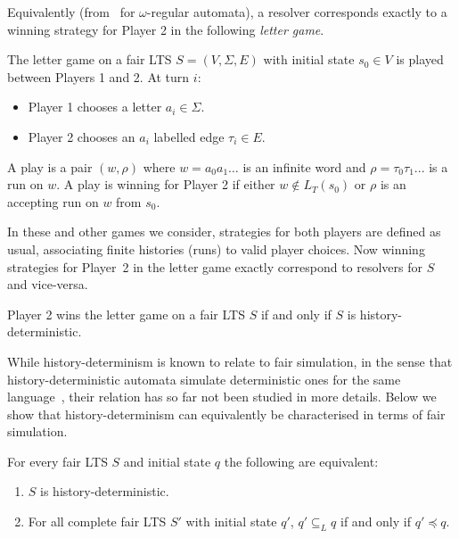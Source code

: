 \documentclass[10pt,a4paper]{amsart}
\theoremstyle{definition}
\numberwithin{equation}{section}
\newcommand{\lang}{L_T}  %
\newcommand{\langincl}[1][L]{\subseteq_{L}}
\newcommand{\fairsim}[1][]{\preceq}
\newcommand{\lts}{S}
\newcommand{\ltsStates}{V}
\newcommand{\ltsAlphabet}{\Sigma}
\newcommand{\ltsTransitions}{E}
\newcommand{\ltsDef}{\lts = (\ltsStates, \ltsAlphabet, \ltsTransitions)}
\begin{document}
Equivalently (from~\cite{BL19} for $\omega$-regular automata), a resolver corresponds exactly to a winning strategy for Player 2 in the following \textit{letter game}.
\begin{definition}
The letter game on a fair LTS $\ltsDef$ with initial state $s_0\in V$ is played between Players 1 and 2. At turn $i$:
\begin{itemize}
\item Player 1 chooses a letter $a_i\in \Sigma$.
\item Player 2 chooses an $a_i$ labelled edge $\tau_i \in E$.
\end{itemize}
A play is a pair $(w,\rho)$ where $w=a_0a_1\ldots$ is an infinite word and $\rho=\tau_0\tau_1...$ is a run on $w$. A play is winning for Player 2 if either $w\notin \lang(s_0)$ or $\rho$ is an accepting run on $w$ from $s_0$.
\end{definition}
In these and other games we consider, strategies for both players are defined as usual, associating finite histories (runs) to valid player choices.
Now winning strategies for Player~2 in the letter game
exactly correspond to resolvers for $\lts$ and vice-versa.
\begin{proposition}
Player 2 wins the letter game on a fair LTS $S$ if and only if $S$ is history-deterministic.
\end{proposition}




While history-determinism is known to relate to fair simulation, in the sense that history-deterministic automata simulate deterministic ones for the same language~\cite{HP06}, their relation has so far not been studied in more details. Below we show that history-determinism can equivalently be characterised in terms of fair simulation.


\begin{theorem}\label{thm:triangle}
For every fair LTS $\lts$ %
and initial state $q$
the following are equivalent:
\begin{enumerate}
\item \label{triangle-hd} $\lts$ is history-deterministic.
\item \label{triangle-sim}For all complete fair LTS $\lts'$ with initial state $q'$, %
    $q' \langincl q$ if and only if $q' \fairsim q$. 
\end{enumerate}
\end{theorem}
\end{document}
